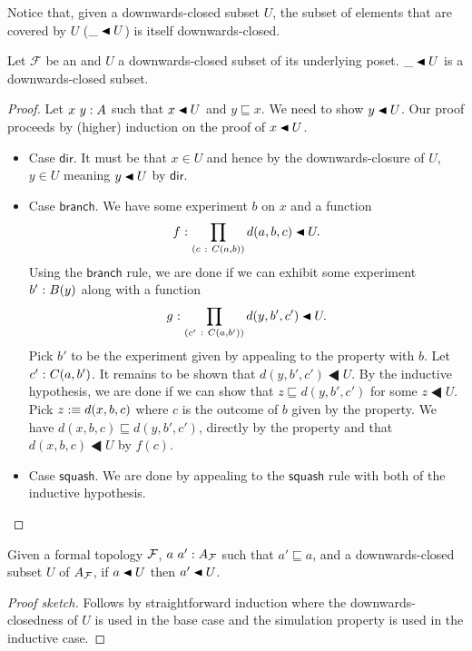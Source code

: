Notice that, given a downwards-closed subset $U$, the subset of elements that are covered
by $U$ ($\covers{\_}{U}$) is itself downwards-closed.
\begin{prop}
  Let $\mathcal{F}$ be an \verintrsys{} and $U$ a downwards-closed subset of its
  underlying poset. $\covers{\_}{U}$ is a downwards-closed subset.
\end{prop}
\begin{proof}
  Let $x~y:A$ such that $\covers{x}{U}$ and $y \sqsubseteq x$. We need to show
  $\covers{y}{U}$. Our proof proceeds by (higher) induction on the proof of
  $\covers{x}{U}$.
  \begin{itemize}
    \item Case $\mathsf{dir}$. It must be that $x \in U$ and hence by the downwards-closure
      of $U$, $y \in U$ meaning $\covers{y}{U}$ by $\mathsf{dir}$.
    \item Case $\mathsf{branch}$. We have some experiment $b$ on $x$ and a function
      $$\oftyI{f}{\pity{c}{C(a, b)}{d(a, b, c) \LHD U}}.$$
      Using the $\mathsf{branch}$ rule, we are done if we can exhibit some experiment
      $b'\hspace{0.1mm}:\hspace{0.1mm}B(y)$ along with a function
      $$\oftyI{g}{\pity{c'}{C(a, b')}{d(y, b', c') \LHD U}}.$$
      Pick $b'$ to be the experiment given by appealing to the \versim{} property with
      $b$. Let $c'\hspace{0.1mm}:\hspace{0.1mm}C(a, b')$. It remains to be shown that $d(y, b', c') \LHD U$.
      By the inductive hypothesis, we are done if we can show that $z \sqsubseteq d(y, b', c')$
      for some $z \LHD U$. Pick $z :\equiv d(x, b, c)$ where $c$ is the outcome of $b$ given
      by the \versim{} property. We have $d(x, b, c) \sqsubseteq d(y, b', c')$, directly by the
      \versim{} property and that $d(x, b, c) \LHD U$ by $f(c)$.
    \item Case $\mathsf{squash}$. We are done by appealing to the $\mathsf{squash}$ rule
      with both of the inductive hypothesis.
  \end{itemize}
\end{proof}

\begin{prop}\label{prop:lem1}
  Given a formal topology $\mathcal{F}{}$, $a~a':A_{\mathcal{F}{}}$ such that $a' \sqsubseteq a$, and a
  downwards-closed subset $U$ of $A_{\mathcal{F}{}}$, if $\covers{a}{U}$ then $\covers{a'}{U}$.
\end{prop}
\begin{proof}[Proof sketch]
  Follows by straightforward induction where the downwards-closedness of $U$ is used
  in the base case and the simulation property is used in the inductive case.
\end{proof}


